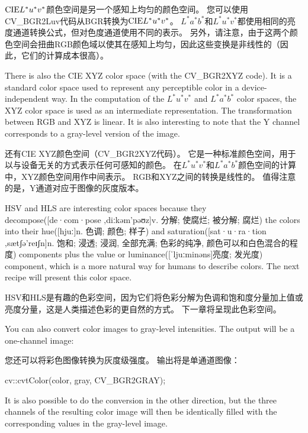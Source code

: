 \documentclass[]{article}
\newenvironment{Shaded}{}{}
\newcommand{\NormalTok}[1]{#1}
\begin{document}
\( \text{CIE}  \space L^{*} u^{*} v^{*} \)颜色空间是另一个感知上均匀的颜色空间。
您可以使用CV\_BGR2Luv代码从BGR转换为\(\text{CIE}  \space L^{*} u^{*} v^{*} \)。
\( L^{*} a^{*} b^{*} \)和\( L^{*} u^{*} v^{*} \)都使用相同的亮度通道转换公式，但对色度通道使用不同的表示。
另外，请注意，由于这两个颜色空间会扭曲RGB颜色域以使其在感知上均匀，因此这些变换是非线性的（因此，它们的计算成本很高）。

There is also the CIE XYZ color space (with the CV\_BGR2XYZ code). It is
a standard color space used to represent any perceptible color in a
device-independent way. In the computation of the \(L^{*}u^{*}v^{*}\)
and \(L^{*}a^{*}b^{*}\) color spaces, the XYZ color space is used as an
intermediate representation. The transformation between RGB and XYZ is
linear. It is also interesting to note that the Y channel corresponds to
a gray-level version of the image.

还有CIE XYZ颜色空间（CV\_BGR2XYZ代码）。
它是一种标准颜色空间，用于以与设备无关的方式表示任何可感知的颜色。
在\(L^{*}u^{*}v^{*}\)和\(L^{*}a^{*}b^{*}\)颜色空间的计算中，XYZ颜色空间用作中间表示。
RGB和XYZ之间的转换是线性的。 值得注意的是，Y通道对应于图像的灰度版本。

HSV and HLS are interesting color spaces because they
decompose({[}de·com·pose \textbar{}\textbar{} ‚diːkəm'pəʊz{]}v. 分解;
使腐烂; 被分解; 腐烂) the colors into their hue({[}hjuː{]}n. 色调; 颜色;
样子) and saturation({[}sat·u·ra·tion \textbar{}\textbar{}
‚sætʃə'reɪʃn{]}n. 饱和; 浸透; 浸润, 全部充满; 色彩的纯净,
颜色可以和白色混合的程度) components plus the value or
luminance({[}ˈljuːminəns{]}亮度; 发光度) component, which is a more
natural way for humans to describe colors. The next recipe will present
this color space.

HSV和HLS是有趣的色彩空间，因为它们将色彩分解为色调和饱和度分量加上值或亮度分量，这是人类描述色彩的更自然的方式。
下一章将呈现此色彩空间。

You can also convert color images to gray-level intensities. The output
will be a one-channel image:

您还可以将彩色图像转换为灰度级强度。 输出将是单通道图像：

\begin{Shaded}
\begin{Highlighting}[]
\NormalTok{cv::cvtColor(color, gray, CV_BGR2GRAY);}
\end{Highlighting}
\end{Shaded}

It is also possible to do the conversion in the other direction, but the
three channels of the resulting color image will then be identically
filled with the corresponding values in the gray-level image.
\end{document}
